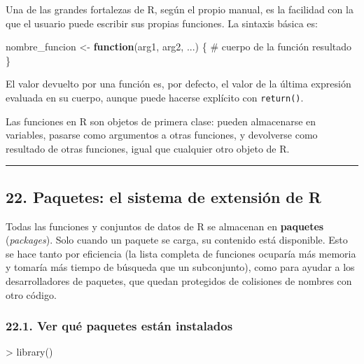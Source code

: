 \documentclass[
  jou,
  floatsintext,
  longtable,
  a4paper,
  nolmodern,
  notxfonts,
  notimes,
  12pt,
  colorlinks=true,linkcolor=blue,citecolor=blue,urlcolor=blue]{apa7}
\newenvironment{Shaded}{\begin{snugshade}}{\end{snugshade}}
\newcommand{\CommentTok}[1]{\textcolor[rgb]{0.37,0.37,0.37}{#1}}
\newcommand{\ControlFlowTok}[1]{\textcolor[rgb]{0.00,0.23,0.31}{\textbf{#1}}}
\newcommand{\FunctionTok}[1]{\textcolor[rgb]{0.28,0.35,0.67}{#1}}
\newcommand{\NormalTok}[1]{\textcolor[rgb]{0.00,0.23,0.31}{#1}}
\newcommand{\OtherTok}[1]{\textcolor[rgb]{0.00,0.23,0.31}{#1}}
\newcommand{\SpecialCharTok}[1]{\textcolor[rgb]{0.37,0.37,0.37}{#1}}
\begin{document}
Una de las grandes fortalezas de R, según el propio manual, es la
facilidad con la que el usuario puede escribir sus propias funciones. La
sintaxis básica es:

\begin{Shaded}
\begin{Highlighting}[]
\NormalTok{nombre\_funcion }\OtherTok{\textless{}{-}} \ControlFlowTok{function}\NormalTok{(arg1, arg2, ...) \{}
  \CommentTok{\# cuerpo de la función}
\NormalTok{  resultado}
\NormalTok{\}}
\end{Highlighting}
\end{Shaded}

El valor devuelto por una función es, por defecto, el valor de la última
expresión evaluada en su cuerpo, aunque puede hacerse explícito con
\texttt{return()}.

Las funciones en R son objetos de primera clase: pueden almacenarse en
variables, pasarse como argumentos a otras funciones, y devolverse como
resultado de otras funciones, igual que cualquier otro objeto de R.

\begin{center}\rule{0.5\linewidth}{0.5pt}\end{center}

\subsection{22. Paquetes: el sistema de extensión de
R}\label{paquetes-el-sistema-de-extensiuxf3n-de-r}

Todas las funciones y conjuntos de datos de R se almacenan en
\textbf{paquetes} (\emph{packages}). Solo cuando un paquete se carga, su
contenido está disponible. Esto se hace tanto por eficiencia (la lista
completa de funciones ocuparía más memoria y tomaría más tiempo de
búsqueda que un subconjunto), como para ayudar a los desarrolladores de
paquetes, que quedan protegidos de colisiones de nombres con otro
código.

\subsubsection{22.1. Ver qué paquetes están
instalados}\label{ver-quuxe9-paquetes-estuxe1n-instalados}

\begin{Shaded}
\begin{Highlighting}[]
\SpecialCharTok{\textgreater{}} \FunctionTok{library}\NormalTok{()}
\end{Highlighting}
\end{Shaded}
\end{document}
